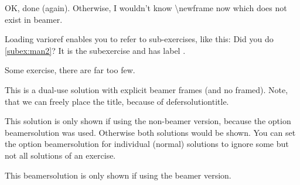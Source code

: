 \ifbeamer{\documentclass{beamer}}{\documentclass[a5paper]{article}}
\begin{document}
\begin{sheet}[date={Novanuar 21, -2022}]
  \begin{exercise}[points={many, many},
    firstline={Read the manual.}]
    \begin{solution}[framed]
      OK, done (again).
      \newframe
      Otherwise, I wouldn't know  \textbackslash newframe now which
      does not exist in beamer.
    \end{solution}
  \end{exercise}

  Loading varioref enables you to refer to sub-exercises, like
  this: Did you do \ref{subex:man2}? It is the subexercise
   and has label .


  \begin{exercise}[points={many, many},
  firstline={Play around with the options.}]
    Some exercise, there are far too few.
    \begin{solution}[defersolutiontitle]
      \begin{frame}
        This is a dual-use solution with explicit
        beamer frames (and no framed).
        \solutiontitle
        Note, that we can freely place the title, because of
        defersolutiontitle.
      \end{frame}
    \end{solution}
  \end{exercise}

  \begin{exercise}[points={many, many},beamersolution,
  firstline={Play around with the options.}]
    \begin{solution}
      This solution is only shown if using the non-beamer version, because the option beamersolution was used. Otherwise both
      solutions would be shown. You can set
      the option beamersolution for individual (normal) solutions
      to ignore some but not all solutions of an exercise.
    \end{solution}
    \begin{beamersolution}[defersolutiontitle]
      \begin{frame}[t]
      \solutiontitle
      This beamersolution is only shown if using the beamer
      version.
      \end{frame}
    \end{beamersolution}
  \end{exercise}




\end{sheet}
\end{document}
